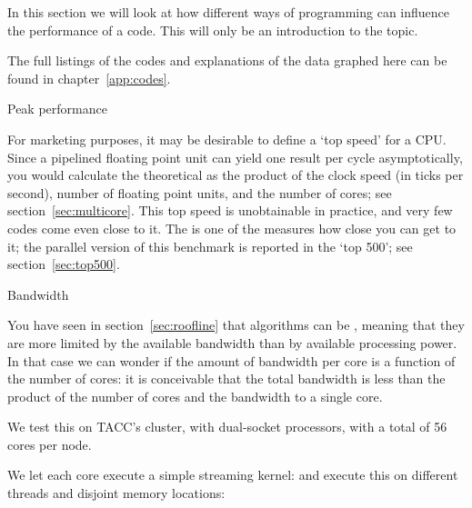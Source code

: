 
In this section we will look at how different ways of programming can
influence the performance of a code. This will only be an introduction
to the topic.

The full listings of the codes and explanations of the data graphed
here can be found in chapter~\ref{app:codes}.

 {Peak performance}

For marketing purposes, it may be desirable to define a `top speed' for a
CPU. Since a pipelined floating point unit can yield one result per
cycle asymptotically, you would calculate the theoretical
 as the product of the clock speed (in
ticks per second), number of floating point units, and the number of
cores; see section~\ref{sec:multicore}.  This top speed is
unobtainable in practice, and very few codes come even close to it.
The  is one of the measures how close
you can get to it; the parallel version of this benchmark is reported
in the `top 500'; see section~\ref{sec:top500}. 

 {Bandwidth}

You have seen in section~\ref{sec:roofline} that algorithms can be
, meaning that they are more limited
by the available bandwidth than by available processing power.
In that case we can wonder if the amount of bandwidth per core
is a function of the number of cores: it is conceivable that
the total bandwidth is less than the product
of the number of cores and the bandwidth to a single core.

We test this on TACC's  cluster,
with dual-socket  processors,
with a total of 56 cores per node.

We let each core execute a simple streaming kernel:
%
%
and execute this on different threads and disjoint memory locations:
%


